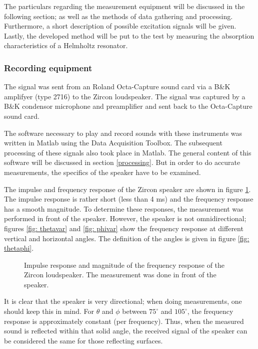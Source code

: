 The particulars regarding the measurement equipment will be discussed in the following section; as well as the methods of data gathering and processing. Furthermore, a short description of possible excitation signals will be given. Lastly, the developed method will be put to the test by measuring the absorption characteristics of a Helmholtz resonator.



\subsubsection{Recording equipment}

The signal was sent from an Roland Octa-Capture sound card via a B\&K amplifyer (type 2716) to the Zircon loudspeaker. The signal was captured by a B\&K condensor microphone and preamplifier and sent back to the Octa-Capture sound card.

The software necessary to play and record sounds with these instruments was written in Matlab using the Data Acquisition Toolbox. The subsequent processing of these signals also took place in Matlab. The general content of this software will be discussed in section \ref{processing}. But in order to do accurate measurements, the specifics of the speaker have to be examined.

The impulse and frequency response of the Zircon speaker are shown in figure \ref{fig: ZirconImp}. The impulse response is rather short (less than 4 ms) and the frequency response has a smooth magnitude. To determine these responses, the measurement was performed in front of the speaker. However, the speaker is not omnidirectional; figures \ref{fig: thetavar} and \ref{fig: phivar} show the frequency response at different vertical and horizontal angles. The definition of the angles is given in figure \ref{fig: thetaphi}. 
\begin{figure}[h!]
  \centering
  \caption{Impulse response and magnitude of the frequency response of the Zircon loudspeaker. The measurement was done in front of the speaker. }
  \label{fig: ZirconImp}
\end{figure}


It is clear that the speaker is very directional; when doing measurements, one should keep this in mind. For $\theta$ and $\phi$ between $75^{\circ}$ and $105^{\circ}$, the frequency response is approximately constant (per frequency). Thus, when the measured sound is reflected within that solid angle, the received signal of the speaker can be considered the same for those reflecting surfaces.

